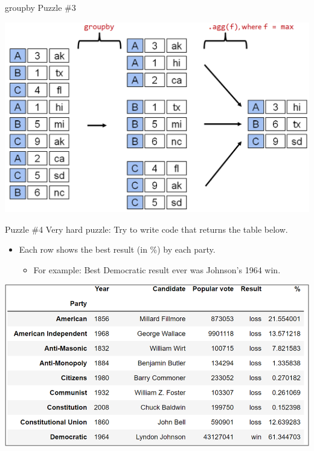 \documentclass[aspectratio=169]{../latex_main/tntbeamer}  %
\begin{document}
    \begin{frame}{groupby Puzzle \#3}

        \centering
        \includegraphics[scale=.36]{Bild27}
    \end{frame}
    
    
     \begin{frame}{ Puzzle \#4}
        Very hard puzzle: Try to write code that returns the table below.
        \begin{itemize}
            \item Each row shows the best result (in \%) by each party.
            \begin{itemize}
                \item For example: Best Democratic result ever was Johnson’s 1964 win.
            \end{itemize}
        \end{itemize}
        \centering
        \includegraphics[scale=.56]{Bild29}
    \end{frame}
    
    
    
\end{document}
